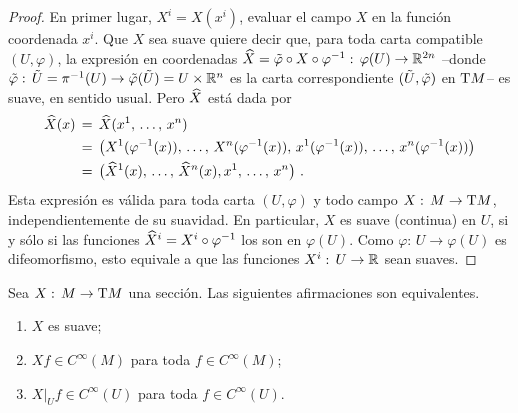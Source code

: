\begin{proof}
	En primer lugar, $X^i=X(x^i)$, evaluar el campo $X$ en la funci\'{o}n
	coordenada $x^i$. Que $X$ sea suave quiere decir que, para toda carta
	compatible $(U,\varphi)$, la expresi\'{o}n en coordenadas
	\begin{math}
		\widehat{X}=
			\tilde{\varphi}\circ X\circ\varphi^{-1}:\,
			\varphi(U)\rightarrow\mathbb{R}^{2n}
	\end{math} --donde
	\begin{math}
		\tilde{\varphi}:\,\tilde{U}=\pi^{-1}(U)\rightarrow
			\tilde{\varphi}(\tilde{U})=U\times\mathbb{R}^{n}
	\end{math} es la carta correspondiente
	$(\tilde{U},\tilde{\varphi})$ en $\tangente{M}$-- es suave,
	en sentido usual. Pero $\widehat{X}$ est\'{a} dada por
	\begin{align*}
		\encoordenadas{X}(x) & \,=\,\encoordenadas{X}(\lista*{x}{n}) \\
		& \,=\,
			\big(X^1(\varphi^{-1}(x)),\,\dots,\,
				X^n(\varphi^{-1}(x)),\,
				x^1(\varphi^{-1}(x)),\,\dots,\,
				x^n(\varphi^{-1}(x))\big) \\
		& \,=\,\big(\encoordenadas{X}^1(x),\,\dots,\,
			\encoordenadas{X}^n(x),\lista*{x}{n}\big)
		\text{ .}
	\end{align*}
	Esta expresi\'{o}n es v\'{a}lida para toda carta $(U,\varphi)$ y todo
	campo $X:\,M\rightarrow\tangente{M}$, independientemente de su
	suavidad. En particular, $X$ es suave (continua) en $U$, si y s\'{o}lo
	si las funciones $\widehat{X}^i=X^i\circ\varphi^{-1}$ los son en
	$\varphi(U)$. Como $\varphi:\,U\rightarrow\varphi(U)$ es difeomorfismo,
	esto equivale a que las funciones $X^i:\,U\rightarrow\mathbb{R}$ sean
	suaves.
\end{proof}

\begin{propoEquivalenciaSuavidadCampos}\label{propo:equivalenciasuavidadcampos}
	Sea $X:\,M\rightarrow\tangente{M}$ una secci\'{o}n. Las siguientes
	afirmaciones son equivalentes.
	\begin{enumerate}
		\item\label{propo:equivalenciasuavidadcampos:seccion}
			$X$ es suave;
		\item\label{propo:equivalenciasuavidadcampos:global}
			$Xf\in C^\infty(M)$ para toda $f\in C^\infty(M)$;
		\item\label{propo:equivalenciasuavidadcampos:entornos}
			$X|_Uf\in C^\infty(U)$ para toda $f\in C^\infty(U)$.
	\end{enumerate}
\end{propoEquivalenciaSuavidadCampos}

